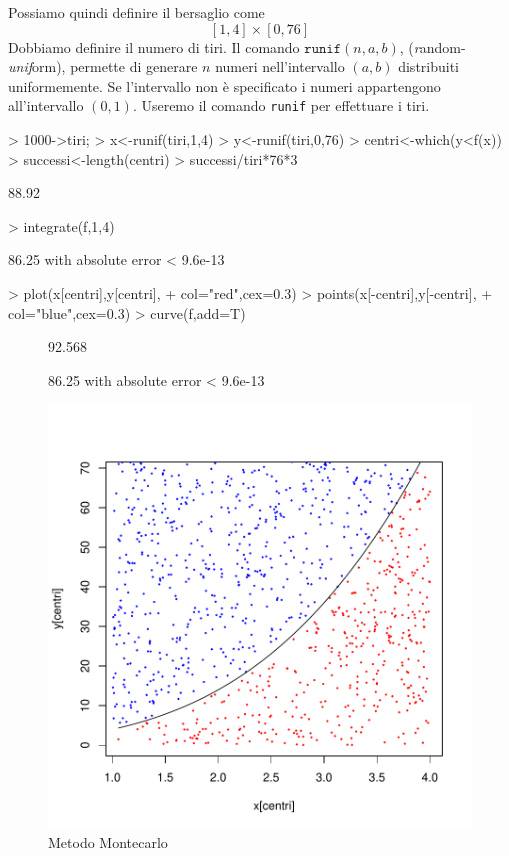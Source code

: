 \documentclass[onecolumn,11pt]{book}
\begin{document}
Possiamo quindi definire il bersaglio come
$$[1,4]\times [0,76]$$
Dobbiamo definire il numero di tiri.
Il comando $\texttt{runif}(n,a,b)$, ({\it r}andom-{\it unif}orm), permette di generare $n$ numeri nell'intervallo $(a,b)$ distribuiti uniformemente. Se l'intervallo non \`e specificato i numeri appartengono all'intervallo $(0,1)$.
Useremo il comando  \texttt{runif} per effettuare i tiri.

\par
\begin{Schunk}
\begin{Sinput}
> 1000->tiri;
> x<-runif(tiri,1,4)
> y<-runif(tiri,0,76)
> centri<-which(y<f(x))
> successi<-length(centri)
> successi/tiri*76*3
\end{Sinput}
\begin{Soutput}
[1] 88.92
\end{Soutput}
\begin{Sinput}
> integrate(f,1,4)
\end{Sinput}
\begin{Soutput}
86.25 with absolute error < 9.6e-13
\end{Soutput}
\begin{Sinput}
> plot(x[centri],y[centri],
+ col="red",cex=0.3)
> points(x[-centri],y[-centri],
+ col="blue",cex=0.3)
> curve(f,add=T)
\end{Sinput}
\end{Schunk}
\begin{figure}[htbp]
\begin{center}
\begin{Schunk}
\begin{Soutput}
[1] 92.568
\end{Soutput}
\begin{Soutput}
86.25 with absolute error < 9.6e-13
\end{Soutput}
\end{Schunk}
\includegraphics{Rmatematica-159}
\caption{Metodo Montecarlo }
\label{fig:Montec1}
\end{center}
\end{figure}
\end{document}
